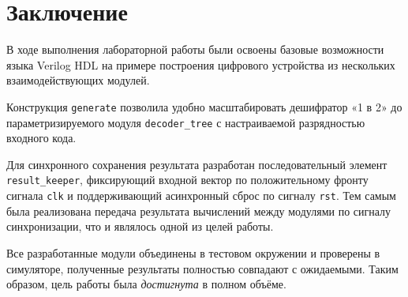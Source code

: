 \section{Заключение}

В ходе выполнения лабораторной работы были освоены базовые возможности языка Verilog HDL на примере построения цифрового устройства из нескольких взаимодействующих модулей.

Конструкция \texttt{generate} позволила удобно масштабировать дешифратор «1 в 2» до параметризируемого модуля \texttt{decoder\_tree} с настраиваемой разрядностью входного кода. 

Для синхронного сохранения результата разработан последовательный элемент
\texttt{result\_keeper}, фиксирующий входной вектор по положительному
фронту сигнала \texttt{clk} и поддерживающий асинхронный сброс по сигналу
\texttt{rst}. Тем самым была реализована передача результата вычислений
между модулями по сигналу синхронизации, что и являлось одной из целей
работы.

Все разработанные модули объединены в тестовом окружении и проверены в симуляторе, полученные результаты полностью совпадают с ожидаемыми. Таким образом, цель работы была \textit{достигнута} в полном объёме.